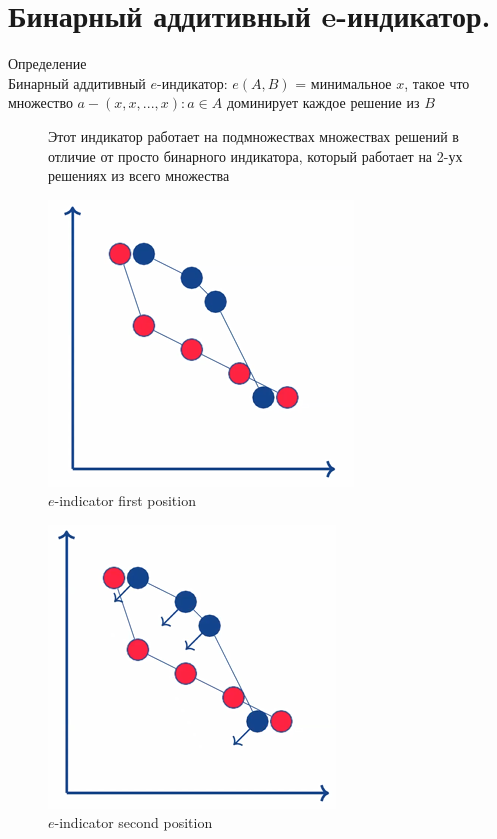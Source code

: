\section{Бинарный аддитивный e-индикатор.}
Определение\\
Бинарный аддитивный $e$-индикатор: $e(A, B)$ = минимальное $x$, такое что
множество ${a − (x, x,...,x) : a ∈A}$ доминирует каждое решение из $B$\\

\begin{figure}[!ht]
Этот индикатор работает на подмножествах множествах решений в отличие от просто бинарного индикатора, который работает на 2-ух решениях из всего множества
\begin{center}
    \includegraphics[width=0.3\linewidth]{images/e-indicator1.PNG}
    \caption{$e$-indicator first position}
    \label{fig:mpr}
    
\end{center}

\end{figure}

\begin{figure}[!ht]

\begin{center}
    \includegraphics[width=0.3\linewidth]{images/e-indicator3.PNG}
    \caption{$e$-indicator second position}
    \label{fig:mpr}
    
\end{center}

\end{figure}

